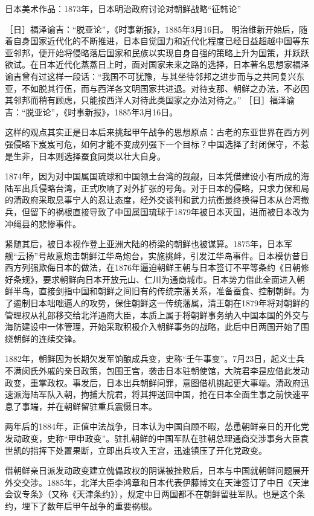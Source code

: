 \documentclass[12pt,UTF8]{ctexbook}
\begin{document}
日本美术作品：1873年，日本明治政府讨论对朝鲜战略“征韩论”

［日］福泽谕吉：“脱亚论”，《时事新报》，1885年3月16日。
明治维新开始后，随着自身国家近代化的不断推进，日本自觉国力和近代化程度已经日益超越中国等东亚邻邦，便开始将侵略落后国家和民族以实现自身自强的策略上升为国策，并跃跃欲试。在日本近代化蒸蒸日上时，面对国家未来之路的选择，日本著名思想家福泽谕吉曾有过这样一段话：“我国不可犹豫，与其坐待邻邦之进步而与之共同复兴东亚，不如脱其行伍，而与西洋各文明国家共进退。对待支那、朝鲜之办法，不必因其邻邦而稍有顾虑，只能按西洋人对待此类国家之办法对待之。” ［日］福泽谕吉：“脱亚论”，《时事新报》，1885年3月16日。

这样的观点其实正是日本后来挑起甲午战争的思想原点：古老的东亚世界在西方列强侵略下岌岌可危，如何才能不变成列强下一个目标？中国选择了封闭保守，不惹是生非，日本则选择蚕食同类以壮大自身。

1874年，因为对中国属国琉球和中国领土台湾的觊觎，日本凭借建设小有所成的海陆军出兵侵略台湾，正式吹响了对外扩张的号角。对于日本的侵略，只求力保和局的清政府采取息事宁人的忍让态度，经外交谈判和武力抗衡最终换得日本从台湾撤兵，但留下的祸根直接导致了中国属国琉球于1879年被日本灭国，进而被日本改为冲绳县的悲惨事件。

紧随其后，被日本视作登上亚洲大陆的桥梁的朝鲜也被谋算。1875年，日本军舰“云扬”号故意炮击朝鲜江华岛炮台，实施挑衅，引发江华岛事件。日本模仿昔日西方列强欺侮日本的做法，在1876年逼迫朝鲜王朝与日本签订不平等条约《日朝修好条规》，要求朝鲜向日本开放元山、仁川为通商城市。日本势力借此全面进入朝鲜半岛，直接剑指中国和朝鲜之间旧有的传统宗藩关系，准备蚕食、控制朝鲜。为了遏制日本咄咄逼人的攻势，保住朝鲜这一传统藩属，清王朝在1879年将对朝鲜的管理权从礼部移交给北洋通商大臣，本质上属于将朝鲜事务纳入中国本国的外交与海防建设中一体管理，开始采取积极介入朝鲜事务的战略，此后中日两国开始了围绕朝鲜的连续交锋。

1882年，朝鲜因为长期欠发军饷酿成兵变，史称“壬午事变”。7月23日，起义士兵不满闵氏外戚的亲日政策，包围王宫，袭击日本驻朝使馆，大院君李昰应借此发动政变，重掌政权。事发后，日本出兵朝鲜问罪，意图借机挑起更大事端。清政府迅速派海陆军队入朝，拘捕大院君，将其押送回中国，抢在日本全面生事之前快速平息了事端，并在朝鲜留驻重兵震慑日本。

两年后的1884年，正值中法战争，日本认为中国自顾不暇，怂恿朝鲜亲日的开化党发动政变，史称“甲申政变”。驻扎朝鲜的中国军队在驻朝总理通商交涉事务大臣袁世凯的指挥下处置果断，立即出兵攻入王宫，迅速镇压了开化党政变。

借朝鲜亲日派发动政变建立傀儡政权的阴谋被挫败后，日本与中国就朝鲜问题展开外交交涉。1885年，北洋大臣李鸿章和日本代表伊藤博文在天津签订了中日《天津会议专条》（又称《天津条约》），规定中日两国都不在朝鲜留驻军队。也是这个条约，埋下了数年后甲午战争的重要祸根。
\end{document}
